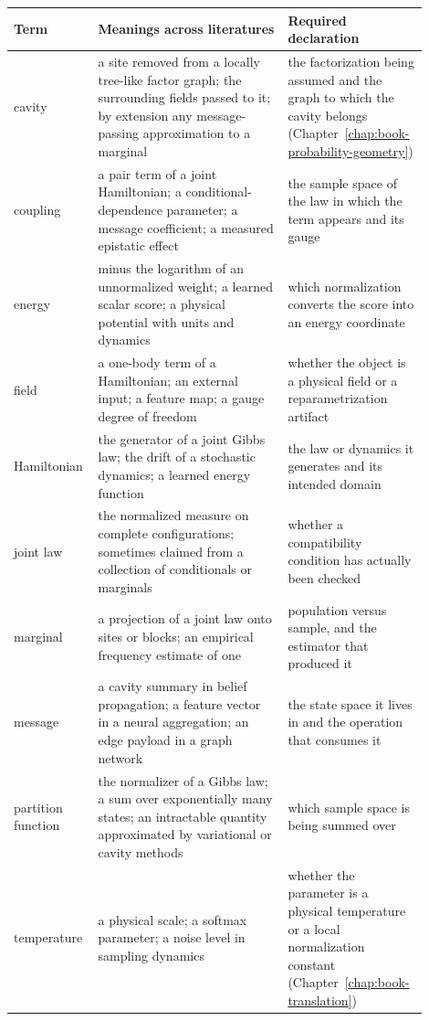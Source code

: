 \begin{center}
\small
\setlength{\tabcolsep}{4pt}
\begin{tabular}{@{}>{\raggedright\arraybackslash}p{0.14\linewidth}
                >{\raggedright\arraybackslash}p{0.44\linewidth}
                >{\raggedright\arraybackslash}p{0.32\linewidth}@{}}
\toprule
Term & Meanings across literatures & Required declaration \\
\midrule
cavity & a site removed from a locally tree-like factor graph; the surrounding fields passed to
it; by extension any message-passing approximation to a marginal &
the factorization being assumed and the graph to which the cavity belongs
(Chapter~\ref{chap:book-probability-geometry}) \\
coupling & a pair term of a joint Hamiltonian; a conditional-dependence parameter; a message
coefficient; a measured epistatic effect &
the sample space of the law in which the term appears and its gauge \\
energy & minus the logarithm of an unnormalized weight; a learned scalar score; a physical
potential with units and dynamics &
which normalization converts the score into an energy coordinate \\
field & a one-body term of a Hamiltonian; an external input; a feature map; a gauge degree of
freedom &
whether the object is a physical field or a reparametrization artifact \\
Hamiltonian & the generator of a joint Gibbs law; the drift of a stochastic dynamics; a learned
energy function &
the law or dynamics it generates and its intended domain \\
joint law & the normalized measure on complete configurations; sometimes claimed from a
collection of conditionals or marginals &
whether a compatibility condition has actually been checked \\
marginal & a projection of a joint law onto sites or blocks; an empirical frequency estimate of
one &
population versus sample, and the estimator that produced it \\
message & a cavity summary in belief propagation; a feature vector in a neural aggregation; an
edge payload in a graph network &
the state space it lives in and the operation that consumes it \\
partition function & the normalizer of a Gibbs law; a sum over exponentially many states; an
intractable quantity approximated by variational or cavity methods &
which sample space is being summed over \\
temperature & a physical scale; a softmax parameter; a noise level in sampling dynamics &
whether the parameter is a physical temperature or a local normalization constant
(Chapter~\ref{chap:book-translation}) \\
\bottomrule
\end{tabular}
\end{center}

